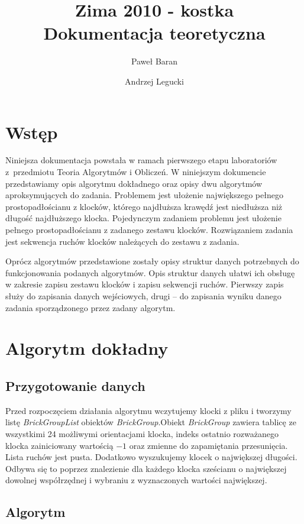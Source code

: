 \documentclass[12pt]{article}
\title{
\Huge{
Zima 2010 - kostka
} \\[0.5em]
\LARGE{
Dokumentacja teoretyczna
}
}
\author{
	Paweł Baran \and Andrzej Legucki
}
\begin{document}
\maketitle

\newpage

\tableofcontents

\newpage
\section{Wstęp}
Niniejsza dokumentacja powstała w ramach pierwszego etapu laboratoriów
z~przedmiotu Teoria Algorytmów i Obliczeń. W niniejszym dokumencie
przedstawiamy opis algorytmu dokładnego oraz opisy dwu algorytmów
aproksymujących do zadania. Problemem jest ułożenie największego
pełnego prostopadłościanu z klocków, którego najdłuższa krawędź jest niedłuższa niż
długość najdłuższego klocka. Pojedynczym zadaniem problemu jest
ułożenie pełnego prostopadłościanu z zadanego zestawu klocków.
Rozwiązaniem zadania jest sekwencja ruchów klocków należących do zestawu
z zadania.

Oprócz algorytmów przedstawione zostały opisy struktur danych potrzebnych
do funkcjonowania podanych algorytmów. Opis struktur danych ułatwi ich
obsługę w zakresie zapisu zestawu klocków i zapisu sekwencji ruchów.
Pierwszy zapis służy do zapisania danych wejściowych, drugi -- do zapisania
wyniku danego zadania sporządzonego przez zadany algorytm.

\section{Algorytm dokładny}
\subsection{Przygotowanie danych}
Przed rozpoczęciem działania algorytmu wczytujemy klocki z pliku i tworzymy listę \textit{BrickGroupList} obiektów
\textit{BrickGroup}.Obiekt \textit{BrickGroup} zawiera tablicę ze wszystkimi 24 możliwymi orientacjami
klocka, indeks ostatnio rozważanego klocka zainiciowany wartością $-1$ oraz zmienne do zapamiętania przesunięcia.
Lista ruchów jest pusta. Dodatkowo wyszukujemy klocek o największej długości. Odbywa się to poprzez znalezienie
dla każdego klocka sześcianu o największej dowolnej współrzędnej i wybraniu z wyznaczonych wartości największej.
\subsection{Algorytm}
\end{document}
